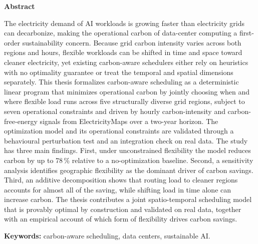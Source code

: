 \begin{center}
{\large\bfseries\color{ieblue} Abstract}
\end{center}
\vspace{0.3cm}

The electricity demand of AI workloads is growing faster than electricity grids can decarbonize, making the operational carbon of data-center computing a first-order sustainability concern. Because grid carbon intensity varies across both regions and hours, flexible workloads can be shifted in time and space toward cleaner electricity, yet existing carbon-aware schedulers either rely on heuristics with no optimality guarantee or treat the temporal and spatial dimensions separately. This thesis formalizes carbon-aware scheduling as a deterministic linear program that minimizes operational carbon by jointly choosing when and where flexible load runs across five structurally diverse grid regions, subject to seven operational constraints and driven by hourly carbon-intensity and carbon-free-energy signals from ElectricityMaps over a two-year horizon. The optimization model and its operational constraints are validated through a behavioural perturbation test and an integration check on real data. The study has three main findings. First, under unconstrained flexibility the model reduces carbon by up to 78\,\% relative to a no-optimization baseline. Second, a sensitivity analysis identifies geographic flexibility as the dominant driver of carbon savings. Third, an additive decomposition shows that routing load to cleaner regions accounts for almost all of the saving, while shifting load in time alone can increase carbon. The thesis contributes a joint spatio-temporal scheduling model that is provably optimal by construction and validated on real data, together with an empirical account of which form of flexibility drives carbon savings.

\vspace{0.3cm}
\noindent\textbf{Keywords:} carbon-aware scheduling, data centers, sustainable AI.
\clearpage
